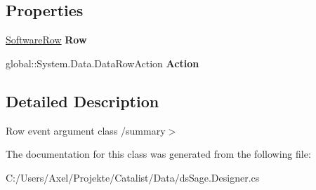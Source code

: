 \subsection*{Properties}
\begin{DoxyCompactItemize}
\item 
\hyperlink{class_products_1_1_data_1_1ds_sage_1_1_software_row}{Software\+Row} {\bfseries Row}\hypertarget{class_products_1_1_data_1_1ds_sage_1_1_software_row_change_event_a3c44480d4086e415c486f232186034f3}{}\label{class_products_1_1_data_1_1ds_sage_1_1_software_row_change_event_a3c44480d4086e415c486f232186034f3}

\item 
global\+::\+System.\+Data.\+Data\+Row\+Action {\bfseries Action}\hypertarget{class_products_1_1_data_1_1ds_sage_1_1_software_row_change_event_a8b2ca02c4d2cfaf6bf52b238a6dd25ae}{}\label{class_products_1_1_data_1_1ds_sage_1_1_software_row_change_event_a8b2ca02c4d2cfaf6bf52b238a6dd25ae}

\end{DoxyCompactItemize}


\subsection{Detailed Description}
Row event argument class /summary$>$ 

The documentation for this class was generated from the following file\+:\begin{DoxyCompactItemize}
\item 
C\+:/\+Users/\+Axel/\+Projekte/\+Catalist/\+Data/ds\+Sage.\+Designer.\+cs\end{DoxyCompactItemize}
